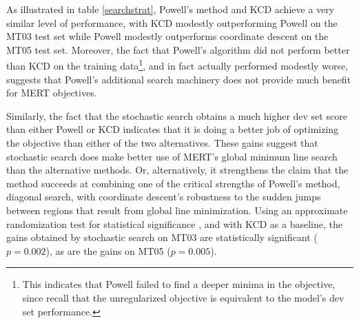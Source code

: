\documentclass[11pt]{article}
\begin{document}
As illustrated in table \ref{searchstrat}, Powell's method and KCD achieve a very similar level of performance, with KCD modestly outperforming Powell on the MT03 test set while Powell modestly outperforms coordinate descent on the MT05 test set. Moreover, the fact that Powell's algorithm did not perform better than KCD on the training data\footnote{This indicates that Powell failed to find a deeper minima in the objective, since recall that the unregularized objective is equivalent to the model's dev set performance.}, and in fact actually performed modestly worse, suggests that Powell's additional search machinery does not provide much benefit for MERT objectives. 

Similarly, the fact that the stochastic search obtains a much higher dev set score than either Powell or KCD indicates that it is doing a better job of optimizing the objective than either of the two alternatives. These gains suggest that stochastic search does make better use of MERT's global minimum line search than the alternative methods. Or, alternatively, it strengthens the claim that the method succeeds at combining one of the critical strengths of Powell's method, diagonal search, with coordinate descent's robustness to the sudden jumps between regions that result from global line minimization. Using an approximate randomization test for statistical significance \cite{fk2005}, and with KCD as a baseline, the gains obtained by stochastic search on MT03 are statistically significant (\mbox{$p = 0.002$}), as are the gains on MT05 (\mbox{$p=0.005$}). 

 
\end{document}
